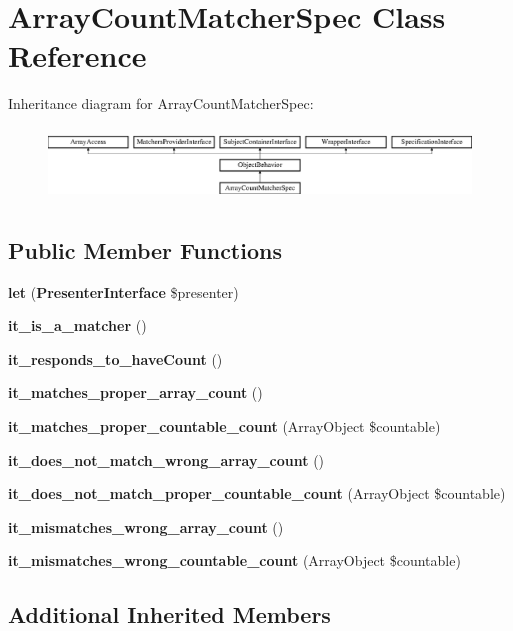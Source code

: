 \section{Array\+Count\+Matcher\+Spec Class Reference}
\label{classspec_1_1_php_spec_1_1_matcher_1_1_array_count_matcher_spec}
Inheritance diagram for Array\+Count\+Matcher\+Spec\+:\begin{figure}[H]
\begin{center}
\leavevmode
\includegraphics[height=1.953488cm]{classspec_1_1_php_spec_1_1_matcher_1_1_array_count_matcher_spec}
\end{center}
\end{figure}
\subsection*{Public Member Functions}
\begin{DoxyCompactItemize}
\item 
{\bf let} ({\bf Presenter\+Interface} \$presenter)
\item 
{\bf it\+\_\+is\+\_\+a\+\_\+matcher} ()
\item 
{\bf it\+\_\+responds\+\_\+to\+\_\+have\+Count} ()
\item 
{\bf it\+\_\+matches\+\_\+proper\+\_\+array\+\_\+count} ()
\item 
{\bf it\+\_\+matches\+\_\+proper\+\_\+countable\+\_\+count} (Array\+Object \$countable)
\item 
{\bf it\+\_\+does\+\_\+not\+\_\+match\+\_\+wrong\+\_\+array\+\_\+count} ()
\item 
{\bf it\+\_\+does\+\_\+not\+\_\+match\+\_\+proper\+\_\+countable\+\_\+count} (Array\+Object \$countable)
\item 
{\bf it\+\_\+mismatches\+\_\+wrong\+\_\+array\+\_\+count} ()
\item 
{\bf it\+\_\+mismatches\+\_\+wrong\+\_\+countable\+\_\+count} (Array\+Object \$countable)
\end{DoxyCompactItemize}
\subsection*{Additional Inherited Members}


